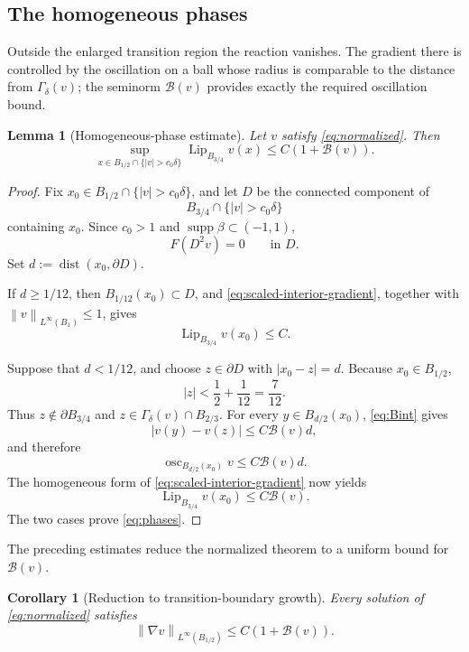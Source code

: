 \documentclass[11pt,letterpaper]{amsart}
\numberwithin{equation}{section}
\DeclareMathOperator{\dist}{dist}
\DeclareMathOperator{\osc}{osc}
\DeclareMathOperator{\Lip}{Lip}
\newcommand{\norm}[1]{\left\lVert #1\right\rVert}
\newtheorem{lemma}[theorem]{Lemma}
\newtheorem{corollary}[theorem]{Corollary}
\theoremstyle{definition}
\theoremstyle{remark}
\begin{document}
\subsection{The homogeneous phases}

Outside the enlarged transition region the reaction vanishes. The gradient
there is controlled by the oscillation on a ball whose radius is comparable
to the distance from $\Gamma_\delta(v)$; the seminorm $\mathcal B(v)$ provides
exactly the required oscillation bound.

\begin{lemma}[Homogeneous-phase estimate]\label{lem:phases}
Let $v$ satisfy \eqref{eq:normalized}. Then
\begin{equation}\label{eq:phases}
\sup_{x\in B_{1/2}\cap\{|v|>c_0\delta\}}
\Lip_{B_{3/4}}v(x)
\leq
C\left(1+\mathcal B(v)\right).
\end{equation}
\end{lemma}

\begin{proof}
Fix $x_0\in B_{1/2}\cap\{|v|>c_0\delta\}$, and let $D$ be the connected
component of
$$
B_{3/4}\cap\{|v|>c_0\delta\}
$$
containing $x_0$. Since $c_0>1$ and
$\operatorname{supp}\beta\subset(-1,1)$,
$$
F(D^2v)=0
\qquad\text{in }D.
$$
Set $d:=\dist(x_0,\partial D)$.

If $d\geq1/12$, then $B_{1/12}(x_0)\subset D$, and
\eqref{eq:scaled-interior-gradient}, together with
$\norm{v}_{L^\infty(B_1)}\leq1$, gives
$$
\Lip_{B_{3/4}}v(x_0)\leq C.
$$

Suppose that $d<1/12$, and choose $z\in\partial D$ with $|x_0-z|=d$.
Because $x_0\in B_{1/2}$,
$$
|z|<\frac12+\frac1{12}=\frac7{12}.
$$
Thus $z\notin\partial B_{3/4}$ and
$z\in\Gamma_\delta(v)\cap B_{2/3}$. For every
$y\in B_{d/2}(x_0)$, \eqref{eq:Bint} gives
$$
|v(y)-v(z)|
\leq
C\mathcal B(v)d,
$$
and therefore
$$
\osc_{B_{d/2}(x_0)}v
\leq
C\mathcal B(v)d.
$$
The homogeneous form of \eqref{eq:scaled-interior-gradient} now yields
$$
\Lip_{B_{3/4}}v(x_0)
\leq
C\mathcal B(v).
$$
The two cases prove \eqref{eq:phases}.
\end{proof}

The preceding estimates reduce the normalized theorem to a uniform bound for
$\mathcal B(v)$.

\begin{corollary}[Reduction to transition-boundary growth]
\label{cor:reduction}
Every solution of \eqref{eq:normalized} satisfies
\begin{equation}\label{eq:reduction}
\norm{\nabla v}_{L^\infty(B_{1/2})}
\leq
C\left(1+\mathcal B(v)\right).
\end{equation}
\end{corollary}
\end{document}
